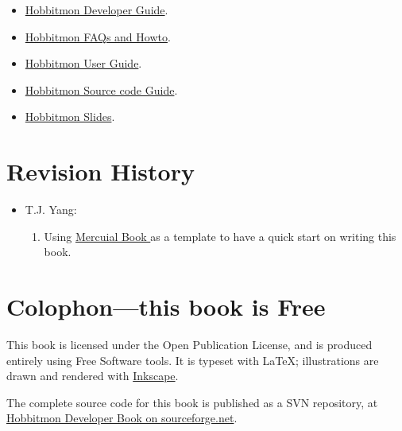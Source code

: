 \begin{itemize}
\item
  \href{http://hobbitmon.svn.sourceforge.net/viewvc/hobbitmon/branches/tjyang/src/books/hobbitmon-developer/en/}{Hobbitmon
    Developer Guide}.
\item
  \href{http://hobbitmon.svn.sourceforge.net/viewvc/hobbitmon/branches/tjyang/src/books/hobbitmon-faq-howto/en/}{Hobbitmon
    FAQs and Howto}.
\item
  \href{http://hobbitmon.svn.sourceforge.net/viewvc/hobbitmon/branches/tjyang/src/books/hobbitmon-developer/en/}{Hobbitmon
    User Guide}.
\item
  \href{http://hobbitmon.svn.sourceforge.net/viewvc/hobbitmon/branches/tjyang/src/books/hobbitmon-sourcecode-guide/en/}{Hobbitmon
Source code Guide}.
\item
  \href{http://hobbitmon.svn.sourceforge.net/viewvc/hobbitmon/branches/tjyang/src/books/hobbitmon-developer/en/}{Hobbitmon
    Slides}.

\end{itemize}

\section{Revision History}

\begin{itemize}
\item T.J. Yang:
 \begin{enumerate}
  \item Using \href{http://hg.serpentine.com/mercurial/book/}{Mercuial Book } as a template to have a quick start on
    writing this book.
 \end{enumerate}

\end{itemize}

\section{Colophon---this book is Free}

This book is licensed under the Open Publication License, and is
produced entirely using Free Software tools.  It is typeset with
\LaTeX{}; illustrations are drawn and rendered with
\href{http://www.inkscape.org/}{Inkscape}.

The complete source code for this book is published as a SVN
repository, at
\href{http://hobbitmon.svn.sourceforge.net/viewvc/hobbitmon/branches/tjyang/src/books/hobbitmon-developer/en/}{Hobbitmon
  Developer Book on sourceforge.net}.


